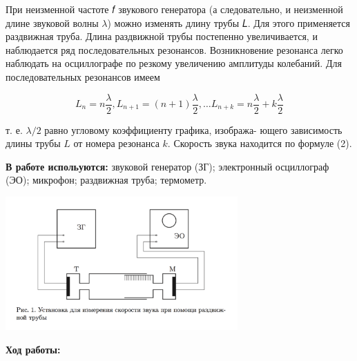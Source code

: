 \documentclass[12pt]{article}
\begin{document}
    При неизменной частоте 𝑓 звукового генератора (а следовательно, и неизменной длине звуковой волны $\lambda$) можно изменять длину трубы 𝐿. Для этого применяется раздвижная труба. Длина раздвижной трубы постепенно увеличивается, и наблюдается ряд последовательных резонансов. Возникновение резонанса легко наблюдать на осциллографе по резкому увеличению амплитуды колебаний. Для последовательных резонансов имеем

    \begin{equation}
        L_n = n\frac{\lambda}{2}, L_{n+1} = (n+1)\frac{\lambda}{2}, \dots L_{n+k} = n\frac{\lambda}{2} + k\frac{\lambda}{2}
    \end{equation}
    
    т. е. $\lambda/2$ равно угловому коэффициенту графика, изобража- ющего зависимость длины трубы $L$ от номера резонанса $k$. Скорость звука находится по формуле (2).

    \textbf{В работе испольуются:} звуковой генератор (ЗГ); электронный осциллограф (ЭО); микрофон; раздвижная труба; термометр.

    \begin{center} 
    \includegraphics[width=3.5in]{stand.png}
    \end{center}

    \textbf{Ход работы:}
\end{document}
